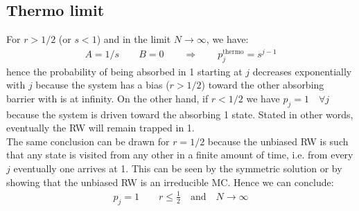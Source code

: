 \documentclass[4apaper,11pt,fleqn]{article}
\theoremstyle{remark}
\theoremstyle{definition}
\begin{document}
\subsection{Thermo limit}
For $r>1/2$ (or $s<1$) and in the limit $N \rightarrow \infty$, we have:
\begin{align}
  \label{eq:asym_limit}
  A = 1/s \qquad B = 0 \qquad \Rightarrow \qquad \boxed{p_j^{\text{thermo}} = s^{j-1}}
\end{align}
hence the probability of being absorbed in 1 starting at $j$ decreases exponentially with $j$ because the system has a bias ($r>1/2$) toward the other absorbing barrier with is at infinity. On the other hand, if $r<1/2$ we have $p_j=1 \quad \forall j$ because the system is driven toward the absorbing 1 state. Stated in other words, eventually the RW will remain trapped in 1.\\
The same conclusion can be drawn for $r=1/2$ because the unbiased RW is such that any state is visited from any other in a finite amount of time, i.e. from every $j$ eventually one arrives at 1. This can be seen by the symmetric solution or by showing that the unbiased RW is an irreducible MC.
Hence we can conclude:
\begin{align*}
  p_j = 1 \qquad r \leq \frac{1}{2} \quad \text{and} \quad N \rightarrow \infty
\end{align*}


\end{document}
